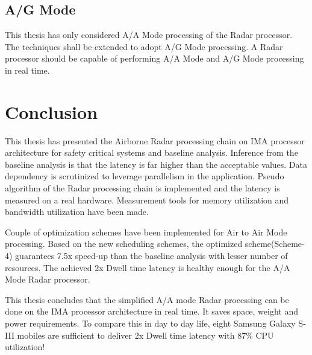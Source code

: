 \subsection{A/G Mode}
This thesis has only considered A/A Mode processing of the Radar processor. The techniques shall be extended to adopt A/G Mode processing. A Radar processor should be capable of performing A/A Mode and A/G Mode processing in real time.

\section{Conclusion}
\label{sec:ch5:conclustion}
This thesis has presented the Airborne Radar processing chain on IMA processor architecture for safety critical systems and baseline  analysis. Inference from the baseline analysis is that the latency is far higher than the acceptable values. Data dependency is scrutinized to leverage parallelism in the application. Pseudo algorithm of the Radar processing chain is implemented and the latency is measured on a real hardware. Measurement tools for memory utilization and bandwidth utilization have been made. \vspace*{0.2cm}

Couple of optimization schemes have been implemented for Air to Air Mode processing. Based on the new scheduling schemes, the optimized scheme(Scheme-4) guarantees 7.5x speed-up than the baseline analysis with lesser number of resources. The achieved 2x Dwell time latency is healthy enough for the A/A Mode Radar processor. \vspace*{0.2cm}

This thesis concludes that the simplified A/A mode Radar processing can be done on the IMA processor architecture in real time. It saves space, weight and power requirements. To compare this in day to day life, eight Samsung Galaxy S-III mobiles are sufficient to deliver 2x Dwell time latency with 87\% CPU utilization!

